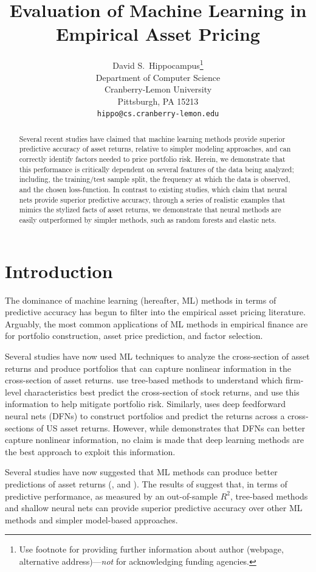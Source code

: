 \documentclass{article}
\title{Evaluation of Machine Learning in Empirical Asset Pricing}
\author{%
  David S.~Hippocampus\thanks{Use footnote for providing further information
    about author (webpage, alternative address)---\emph{not} for acknowledging
    funding agencies.} \\
  Department of Computer Science\\
  Cranberry-Lemon University\\
  Pittsburgh, PA 15213 \\
  \texttt{hippo@cs.cranberry-lemon.edu} \\
}
\begin{document}
\maketitle

\begin{abstract}
	Several recent studies have claimed that machine learning methods provide superior predictive accuracy of asset returns, relative to simpler modeling approaches, and can correctly identify factors needed to price portfolio risk. Herein, we demonstrate that this performance is critically dependent on several features of the data being analyzed; including, the training/test sample split, the frequency at which the data is observed, and the chosen loss-function. In contrast to existing studies, which claim that neural nets provide superior predictive accuracy, through a series of realistic examples that mimics the stylized facts of asset returns, we demonstrate that neural methods are easily outperformed by simpler methods, such as random forests and elastic nets.
\end{abstract}

\section{Introduction}
The dominance of machine learning (hereafter, ML) methods in terms of predictive accuracy has begun to filter into the empirical asset pricing literature. Arguably, the most common applications of ML methods in empirical finance are for portfolio construction, asset price prediction, and factor selection. 

Several studies have now used ML techniques to analyze the cross-section of asset returns and produce portfolios that can capture nonlinear information in the cross-section of asset returns. \cite{moritz2016tree} use tree-based methods to understand which firm-level characteristics best predict the cross-section of stock returns, and use this information to help mitigate portfolio risk. Similarly, \cite{messmer2017deep} uses deep feedforward neural nets (DFNs) to construct portfolios and predict the returns across a cross-sections of US asset returns. However, while \cite{messmer2017deep} demonstrates that DFNs can better capture nonlinear information, no claim is made that deep learning methods are the best approach to exploit this information. 

Several studies have now suggested that ML methods can produce better predictions of asset returns (\cite{gu_empirical_2018}, \cite{hsu_finding_2014} and \cite{feng_deep_2018}). The results of \cite{gu_empirical_2018} suggest that, in terms of predictive performance, as measured by an out-of-sample $R^2$,  tree-based methods and shallow neural nets can provide superior predictive accuracy over other ML methods and simpler model-based approaches. %
\end{document}
